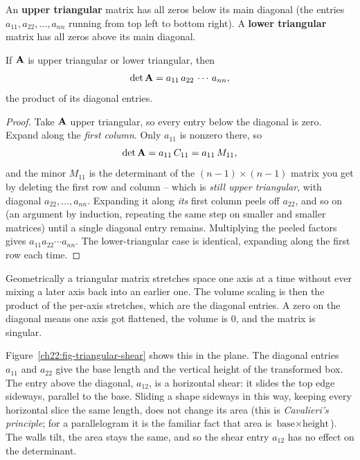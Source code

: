 An \textbf{upper triangular} matrix has all zeros below its main diagonal (the entries
$a_{11},a_{22},\dots,a_{nn}$ running from top left to bottom right). A \textbf{lower triangular}
matrix has all zeros above its main diagonal.

\begin{theorem}\label{ch22:thm-triangular}
If $\mathbf{A}$ is upper triangular or lower triangular, then
\[
\det\mathbf{A} = a_{11}\,a_{22}\,\cdots\,a_{nn},
\]
the product of its diagonal entries.
\end{theorem}

\begin{proof}
Take $\mathbf{A}$ upper triangular, so every entry below the diagonal is zero. Expand along the
\emph{first column}. Only $a_{11}$ is nonzero there, so
\[
\det\mathbf{A} = a_{11}\,C_{11}=a_{11}\,M_{11},
\]
and the minor $M_{11}$ is the determinant of the $(n-1)\times(n-1)$ matrix you get by deleting the
first row and column -- which is \emph{still upper triangular}, with diagonal $a_{22},\dots,a_{nn}$.
Expanding it along \emph{its} first column peels off $a_{22}$, and so on (an argument by induction,
repeating the same step on smaller and smaller matrices) until a single
diagonal entry remains. Multiplying the peeled factors gives $a_{11}a_{22}\cdots a_{nn}$. The
lower-triangular case is identical, expanding along the first row each time.
\end{proof}

\begin{intuitionbox}
Geometrically a triangular matrix stretches space one axis at a time without ever mixing a later axis
back into an earlier one. The volume scaling is then the product of the per-axis stretches, which
are the diagonal entries. A zero on the diagonal means one axis got flattened, the volume is $0$,
and the matrix is singular.
\end{intuitionbox}

Figure~\ref{ch22:fig-triangular-shear} shows this in the plane. The diagonal entries
$a_{11}$ and $a_{22}$ give the base length and the vertical height of the transformed box. The entry
above the diagonal, $a_{12}$, is a horizontal shear: it slides the top edge sideways, parallel to
the base. Sliding a shape sideways in this way, keeping every horizontal slice the same length, does
not change its area (this is \emph{Cavalieri's principle}; for a parallelogram it is the familiar
fact that area is $\text{base}\times\text{height}$). The walls tilt, the area stays the same, and so
the shear entry $a_{12}$ has no effect on the determinant.

